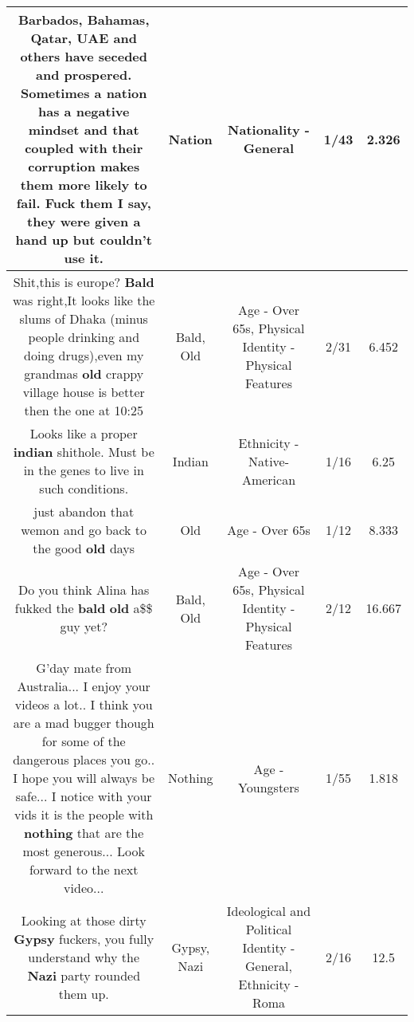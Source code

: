 \documentclass[11pt]{article}
\newlength\mylength
\begin{document}
\begin{center}
\begin{longtable}{|C{.65\mylength}|C{.30\mylength}|C{.12\mylength}|C{.12\mylength}|C{.12\mylength}|}
  \small Barbados, Bahamas, Qatar, UAE and others have seceded and prospered. Sometimes a \textbf{nation} has a negative mindset and that coupled with their corruption makes them more likely to fail. Fuck them I say, they were given a hand up but couldn't use it.\normalsize   & Nation & Nationality - General & 1/43 & 2.326 \\  \hline
  \small Shit,this is europe? \textbf{Bald} was right,It looks like the slums of Dhaka (minus people drinking and doing drugs),even my grandmas \textbf{old} crappy village house is better then the one at 10:25\normalsize   & Bald, Old & Age - Over 65s, Physical Identity - Physical Features & 2/31 & 6.452 \\  \hline
  \small Looks like a proper \textbf{indian} shithole. Must be in the genes to live in such conditions.\normalsize   & Indian & Ethnicity - Native-American & 1/16 & 6.25 \\  \hline
  \small just abandon that wemon and go back to the good \textbf{old} days\normalsize   & Old & Age - Over 65s & 1/12 & 8.333 \\  \hline
  \small Do you think Alina has fukked the \textbf{bald} \textbf{old} a\$\$ guy yet?\normalsize   & Bald, Old & Age - Over 65s, Physical Identity - Physical Features & 2/12 & 16.667 \\  \hline
  \small G'day mate from Australia... I enjoy your videos a lot.. I think you are a mad bugger though for some of the dangerous places you go.. I hope you will always be safe... I notice with your vids it is the people with \textbf{nothing} that are the most generous... Look forward to the next video...\normalsize   & Nothing & Age - Youngsters & 1/55 & 1.818 \\  \hline
  \small Looking at those dirty \textbf{Gypsy} fuckers, you fully understand why the \textbf{Nazi} party rounded them up.\normalsize   & Gypsy, Nazi &  Ideological and Political Identity - General, Ethnicity - Roma & 2/16 & 12.5 \\  \hline

\end{longtable}
\end{center}
\end{document}
